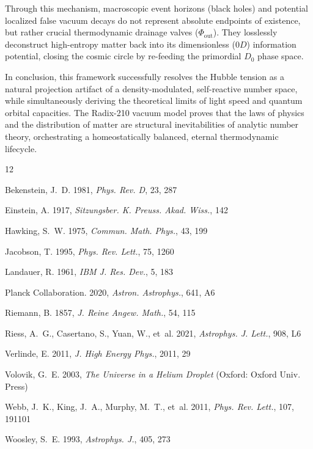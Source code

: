 \documentclass[twocolumn]{aa}
\begin{document}
Through this mechanism, macroscopic event horizons (black holes) and potential localized false vacuum decays do not represent absolute endpoints of existence, but rather crucial thermodynamic drainage valves ($\Phi_{\text{out}}$). They losslessly deconstruct high-entropy matter back into its dimensionless ($0D$) information potential, closing the cosmic circle by re-feeding the primordial $D_0$ phase space.

In conclusion, this framework successfully resolves the Hubble tension as a natural projection artifact of a density-modulated, self-reactive number space, while simultaneously deriving the theoretical limits of light speed and quantum orbital capacities. The Radix-210 vacuum model proves that the laws of physics and the distribution of matter are structural inevitabilities of analytic number theory, orchestrating a homeostatically balanced, eternal thermodynamic lifecycle.


\begin{thebibliography}{12}

Bekenstein, J.~D. 1981, \textit{Phys. Rev. D}, 23, 287

Einstein, A. 1917, \textit{Sitzungsber. K. Preuss. Akad. Wiss.}, 142

Hawking, S.~W. 1975, \textit{Commun. Math. Phys.}, 43, 199

Jacobson, T. 1995, \textit{Phys. Rev. Lett.}, 75, 1260

Landauer, R. 1961, \textit{IBM J. Res. Dev.}, 5, 183

Planck Collaboration. 2020, \textit{Astron. Astrophys.}, 641, A6

Riemann, B. 1857, \textit{J. Reine Angew. Math.}, 54, 115

Riess, A.~G., Casertano, S., Yuan, W., et~al. 2021, \textit{Astrophys. J. Lett.}, 908, L6

Verlinde, E. 2011, \textit{J. High Energy Phys.}, 2011, 29

Volovik, G.~E. 2003, \textit{The Universe in a Helium Droplet} (Oxford: Oxford Univ. Press)

Webb, J.~K., King, J.~A., Murphy, M.~T., et~al. 2011, \textit{Phys. Rev. Lett.}, 107, 191101

Woosley, S.~E. 1993, \textit{Astrophys. J.}, 405, 273

\end{thebibliography} 
\end{document}
